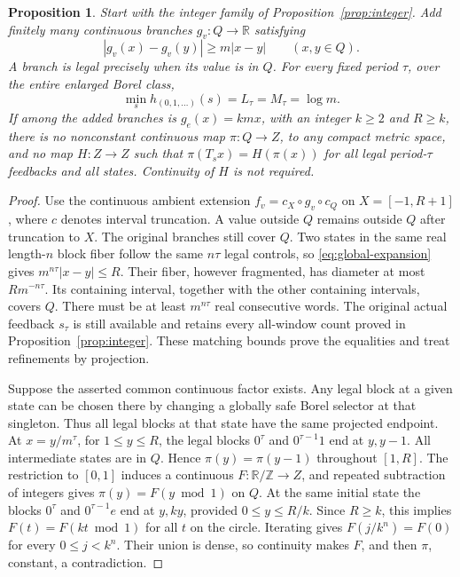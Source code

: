 \documentclass[11pt,reqno]{amsart}
\numberwithin{equation}{section}
\newtheorem{proposition}[theorem]{Proposition}
\theoremstyle{definition}
\theoremstyle{definition}
\begin{document}
\begin{proposition}\label{prop:extension}
Start with the integer family of Proposition~\ref{prop:integer}. Add
finitely many continuous branches $g_v:Q\to\mathbb R$ satisfying
\begin{equation}\label{eq:global-expansion}
 |g_v(x)-g_v(y)|\ge m|x-y|\qquad(x,y\in Q).
\end{equation}
A branch is legal precisely when its value is in $Q$.
For every fixed period $\tau$, over the entire enlarged Borel class,
\[
 \min_s h_{(0,1,\ldots)}(s)=L_\tau=M_\tau=\log m.
\]
If among the added branches is $g_e(x)=kmx$, with an integer
$k\ge2$ and $R\ge k$, there is no nonconstant continuous map
$\pi:Q\to Z$, to any compact metric space, and no map $H:Z\to Z$
such that $\pi(T_sx)=H(\pi(x))$ for all legal period-$\tau$
feedbacks and all states. Continuity of $H$ is not required.
\end{proposition}
\begin{proof}
Use the continuous ambient extension
$f_v=c_X\circ g_v\circ c_Q$ on $X=[-1,R+1]$, where $c$ denotes
interval truncation. A value outside $Q$ remains outside $Q$ after
truncation to $X$. The original branches still cover $Q$.
Two states in the same real length-$n$ block fiber follow the same
$n\tau$ legal controls, so \eqref{eq:global-expansion} gives
$m^{n\tau}|x-y|\le R$. Their fiber, however fragmented, has
diameter at most $Rm^{-n\tau}$. Its containing interval, together
with the other containing intervals, covers $Q$. There must be at
least $m^{n\tau}$ real consecutive words. The original actual
feedback $s_\tau$ is still available and retains every all-window
count proved in Proposition~\ref{prop:integer}. These matching
bounds prove the equalities and treat refinements by projection.

Suppose the asserted common continuous factor exists. Any legal block
at a given state can be chosen there by changing a globally safe
Borel selector at that singleton. Thus all legal blocks at that
state have the same projected endpoint. At $x=y/m^\tau$, for
$1\le y\le R$, the legal blocks $0^\tau$ and $0^{\tau-1}1$
end at $y,y-1$. All intermediate states are in $Q$. Hence
$\pi(y)=\pi(y-1)$ throughout $[1,R]$. The restriction to $[0,1]$
induces a continuous $F:\mathbb R/\mathbb Z\to Z$, and repeated
subtraction of integers gives $\pi(y)=F(y\bmod1)$ on $Q$.
At the same initial state the blocks $0^\tau$ and $0^{\tau-1}e$
end at $y,ky$, provided $0\le y\le R/k$. Since $R\ge k$,
this implies $F(t)=F(kt\bmod1)$ for all $t$ on the circle.
Iterating gives $F(j/k^n)=F(0)$ for every $0\le j<k^n$.
Their union is dense, so continuity makes $F$, and then $\pi$,
constant, a contradiction.
\end{proof}
\end{document}
